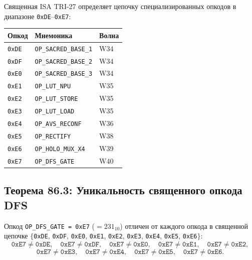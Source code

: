 Священная ISA TRI-27 определяет цепочку специализированных опкодов
в диапазоне \texttt{0xDE}--\texttt{0xE7}:
\begin{center}
\begin{tabular}{lll}
\hline
Опкод & Мнемоника & Волна \\
\hline
\texttt{0xDE} & \texttt{OP\_SACRED\_BASE\_1} & W34 \\
\texttt{0xDF} & \texttt{OP\_SACRED\_BASE\_2} & W34 \\
\texttt{0xE0} & \texttt{OP\_SACRED\_BASE\_3} & W34 \\
\texttt{0xE1} & \texttt{OP\_LUT\_NPU}       & W35 \\
\texttt{0xE2} & \texttt{OP\_LUT\_STORE}     & W35 \\
\texttt{0xE3} & \texttt{OP\_LUT\_LOAD}      & W35 \\
\texttt{0xE4} & \texttt{OP\_AVS\_RECONF}    & W36~\cite{trinity-fpga134} \\
\texttt{0xE5} & \texttt{OP\_RECTIFY}        & W38~\cite{trinity-fpga137} \\
\texttt{0xE6} & \texttt{OP\_HOLO\_MUX\_X4} & W39~\cite{trinity-fpga140} \\
\texttt{0xE7} & \texttt{OP\_DFS\_GATE}      & W40 \\
\hline
\end{tabular}
\end{center}

\subsection{Теорема 86.3: Уникальность священного опкода DFS}
\label{subsec:thm-86-3}

\begin{theorem}
\label{thm:86-3}
Опкод \texttt{OP\_DFS\_GATE = 0xE7} ($= 231_{10}$) отличен от каждого
опкода в священной цепочке $\{$\texttt{0xDE}, \texttt{0xDF}, \texttt{0xE0},
\texttt{0xE1}, \texttt{0xE2}, \texttt{0xE3}, \texttt{0xE4}, \texttt{0xE5},
\texttt{0xE6}$\}$:
\[
  \texttt{0xE7} \neq \texttt{0xDE},\quad
  \texttt{0xE7} \neq \texttt{0xDF},\quad
  \texttt{0xE7} \neq \texttt{0xE0},\quad
  \texttt{0xE7} \neq \texttt{0xE1},\quad
  \texttt{0xE7} \neq \texttt{0xE2},
\]
\[
  \texttt{0xE7} \neq \texttt{0xE3},\quad
  \texttt{0xE7} \neq \texttt{0xE4},\quad
  \texttt{0xE7} \neq \texttt{0xE5},\quad
  \texttt{0xE7} \neq \texttt{0xE6}.
\]
\end{theorem}


